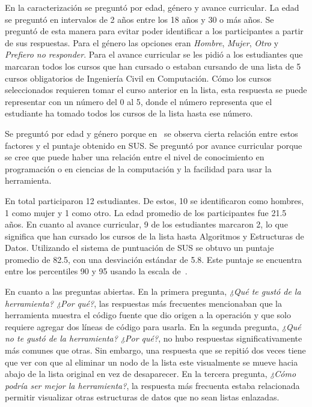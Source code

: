 En la caracterización se preguntó por edad, género y avance curricular. La edad se preguntó en intervalos de 2 años entre los 18 años y 30 o más años. Se preguntó de esta manera para evitar poder identificar a los participantes a partir de sus respuestas. Para el género las opciones eran \textit{Hombre}, \textit{Mujer}, \textit{Otro} y \textit{Prefiero no responder}. Para el avance curricular se les pidió a los estudiantes que marcaran todos los cursos que han cursado o estaban cursando de una lista de 5 cursos obligatorios de Ingeniería Civil en Computación. Cómo los cursos seleccionados requieren tomar el curso anterior en la lista, esta respuesta se puede representar con un número del 0 al 5, donde el número representa que el estudiante ha tomado todos los cursos de la lista hasta ese número.

Se preguntó por edad y género porque en~\cite{evaluation-of-sus} se observa cierta relación entre estos factores y el puntaje obtenido en SUS. Se preguntó por avance curricular porque se cree que puede haber una relación entre el nivel de conocimiento en programación o en ciencias de la computación y la facilidad para usar la herramienta.

En total participaron 12 estudiantes. De estos, 10 se identificaron como hombres, 1 como mujer y 1 como otro. La edad promedio de los participantes fue 21.5 años. En cuanto al avance curricular, 9 de los estudiantes marcaron 2, lo que significa que han cursado los cursos de la lista hasta Algoritmos y Estructuras de Datos. Utilizando el sistema de puntuación de SUS se obtuvo un puntaje promedio de 82.5, con una desviación estándar de 5.8. Este puntaje se encuentra entre los percentiles 90 y 95 usando la escala de~\cite{quantifying-the-user-experience}.

En cuanto a las preguntas abiertas. En la primera pregunta, \textit{¿Qué te gustó de la herramienta? ¿Por qué?}, las respuestas más frecuentes mencionaban que la herramienta muestra el código fuente que dio origen a la operación y que solo requiere agregar dos líneas de código para usarla. En la segunda pregunta, \textit{¿Qué no te gustó de la herramienta? ¿Por qué?}, no hubo respuestas significativamente más comunes que otras. Sin embargo, una respuesta que se repitió dos veces tiene que ver con que al eliminar un nodo de la lista este visualmente se mueve hacia abajo de la lista original en vez de desaparecer. En la tercera pregunta, \textit{¿Cómo podría ser mejor la herramienta?}, la respuesta más frecuenta estaba relacionada permitir visualizar otras estructuras de datos que no sean listas enlazadas.
